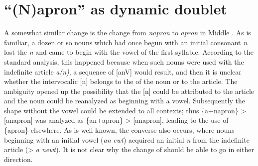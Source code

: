 \documentclass[output=paper,
modfonts
]{LSP/langsci}
\begin{document}
\section{{``(N)apron''} as dynamic doublet}

A somewhat similar change is the change from \emph{napron} to
\emph{apron} in Middle . As is familiar, a dozen or so nouns
which had once begun with an initial consonant \emph{n} lost the
\emph{n} and came to begin with the vowel of the first syllable.
According to the standard analysis, this happened because when such
nouns were used with the indefinite article \emph{a(n)}, a sequence of
{[}{anV}{]} would result, and then it is unclear whether the
intervocalic {[n]} belongs to the  of the noun or to the
article. The ambiguity opened up the possibility that the {[}n{]} could
be attributed to the article and the noun could be reanalyzed as
beginning with a vowel. Subsequently the  shape without the vowel
could be extended to all contexts; thus \{a+napron\} \textgreater{}
{[}anapron{]} was analyzed as \{an+apron\} \textgreater{} {[}anapron{]},
leading to the use of \{apron\} elsewhere. As is well known, the
converse also occurs, where nouns beginning with an initial vowel
(\emph{an ewt}) acquired an initial \emph{n} from the indefinite article
(\textgreater{} \emph{a newt}). It is not clear why the change of
 should be able to go in either direction.
\end{document}
